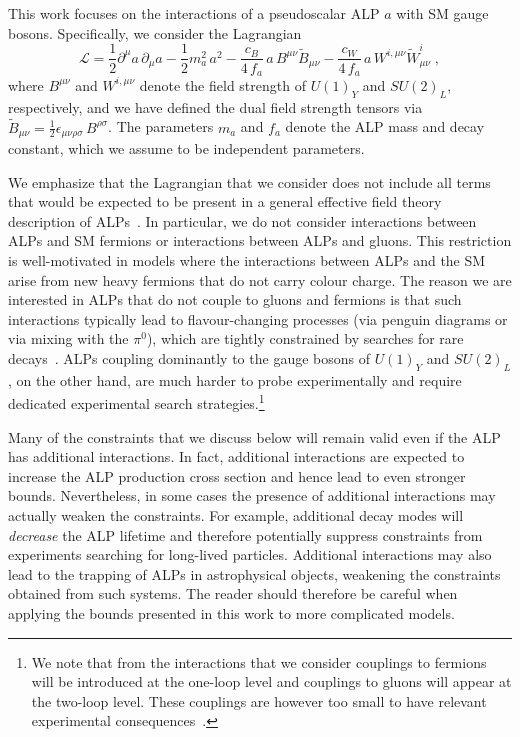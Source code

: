 \documentclass[11pt,a4paper]{article}
\begin{document}
This work focuses on the interactions of a pseudoscalar ALP $a$ with SM gauge bosons. Specifically, we consider the Lagrangian
\begin{equation}
\mathcal{L}= \frac{1}{2} \partial^\mu a \, \partial_\mu a - \frac{1}{2}m^{2}_{a} \, a^2 - \frac{c_B}{4 \, f_a} \, a \, B^{\mu\nu}\tilde{B}_{\mu\nu} - \frac{c_W}{4 \, f_a} \, a \, W^{i,\mu\nu}\tilde{W}^i_{\mu\nu} \; ,
\label{eq:L}
\end{equation}
where $B^{\mu\nu}$ and $W^{i,\mu\nu}$ denote the field strength of $U(1)_Y$ and $SU(2)_L$, respectively, and we have defined the dual field strength tensors via $\tilde{B}_{\mu\nu} = \frac{1}{2} \epsilon_{\mu\nu\rho\sigma} \, B^{\rho\sigma}$. The parameters $m_a$ and $f_a$ denote the ALP mass and decay constant, which we assume to be independent parameters.

We emphasize that the Lagrangian that we consider does not include all terms that would be expected to be present in a general effective field theory description of ALPs~\cite{Brivio:2017ije,Bauer:2017ris}. In particular, we do not consider interactions between ALPs and SM fermions or interactions between ALPs and gluons. This restriction is well-motivated in models where the interactions between ALPs and the SM arise from new heavy fermions that do not carry colour charge. The reason we are interested in ALPs that do not couple to gluons and fermions is that such interactions typically lead to flavour-changing processes (via penguin diagrams or via mixing with the $\pi^0$), which are tightly constrained by searches for rare decays~\cite{Dolan:2014ska,Choi:2017gpf}. ALPs coupling dominantly to the gauge bosons of $U(1)_Y$ and $SU(2)_L$, on the other hand, are much harder to probe experimentally and require dedicated experimental search strategies.\footnote{We note that from the interactions that we consider couplings to fermions will be introduced at the one-loop level and couplings to gluons will appear at the two-loop level. These couplings are however too small to have relevant experimental consequences~\cite{Bauer:2017ris}.}

Many of the constraints that we discuss below will remain valid even if the ALP has additional interactions. In fact, additional interactions are expected to increase the ALP production cross section and hence lead to even stronger bounds. Nevertheless, in some cases the presence of additional interactions may actually weaken the constraints. For example, additional decay modes will \emph{decrease} the ALP lifetime and therefore potentially suppress constraints from experiments searching for long-lived particles. Additional interactions may also lead to the trapping of ALPs in astrophysical objects, weakening the constraints obtained from such systems. The reader should therefore be careful when applying the bounds presented in this work to more complicated models.
\end{document}
